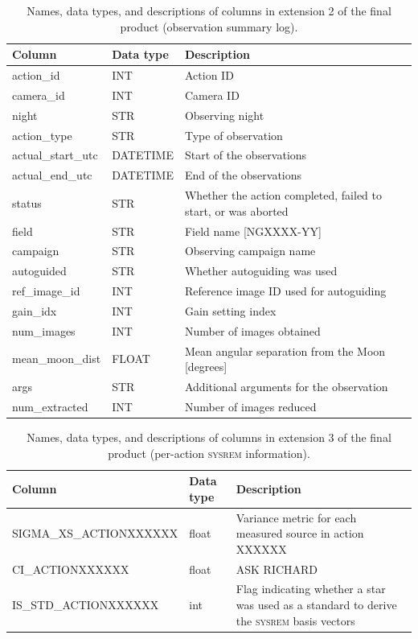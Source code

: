 \documentclass[fleqn,usenatbib]{mnras}
\begin{document}
\begin{table}
    \centering
    \caption{Names, data types, and descriptions of columns in extension 2 of the final product (observation summary log).}
    \label{tab:final_product_cols_tab2}
    \begin{tabularx}{\columnwidth}{@{}ll>{\raggedright\arraybackslash}X@{}}
    \toprule
    Column & Data type & Description \\
    \midrule
    action\_id & INT & Action ID \\
    camera\_id & INT & Camera ID \\
    night & STR & Observing night \\
    action\_type & STR & Type of observation \\
    actual\_start\_utc & DATETIME & Start of the observations \\
    actual\_end\_utc & DATETIME & End of the observations \\
    status & STR & Whether the action completed, failed to start, or was aborted \\
    field & STR & Field name [NGXXXX-YY] \\
    campaign & STR & Observing campaign name \\
    autoguided & STR & Whether autoguiding was used \\
    ref\_image\_id & INT & Reference image ID used for autoguiding \\
    gain\_idx & INT & Gain setting index \\
    num\_images & INT & Number of images obtained \\
    mean\_moon\_dist & FLOAT & Mean angular separation from the Moon [degrees] \\
    args & STR & Additional arguments for the observation \\
    num\_extracted & INT & Number of images reduced \\
    \bottomrule
    \end{tabularx}
\end{table}




\begin{table}
    \centering
    \caption{Names, data types, and descriptions of columns in extension 3 of the final product (per-action \textsc{sysrem} information).}
    \label{tab:final_product_cols_tab3}
    \begin{tabularx}{\textwidth}{@{}ll>{\raggedright\arraybackslash}X@{}}
    \toprule
    Column & Data type & Description \\
    \midrule
    SIGMA\_XS\_ACTIONXXXXXX & float & Variance metric for each measured source in action XXXXXX \\
    CI\_ACTIONXXXXXX & float & ASK RICHARD \\
    IS\_STD\_ACTIONXXXXXX & int & Flag indicating whether a star was used as a standard to derive the \textsc{sysrem} basis vectors \\
    \bottomrule
    \end{tabularx}
\end{table}
\end{document}
